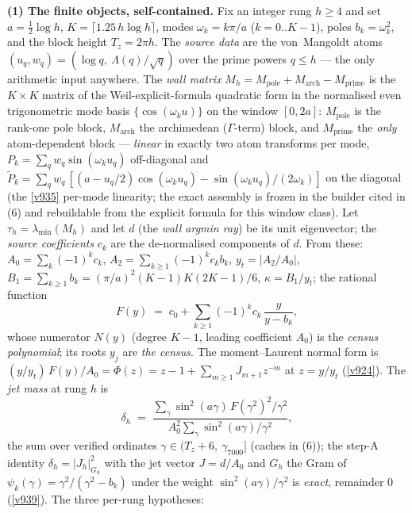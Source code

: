 \par\smallskip\noindent\textbf{(1) The finite objects, self-contained.}  Fix an integer rung
$h \ge 4$ and set $a = \tfrac12\log h$, $K = \lceil 1.25\,h\log h\rceil$, modes
$\omega_k = k\pi/a$ ($k = 0..K{-}1$), poles $b_k = \omega_k^2$, and the block height
$T_z = 2\pi h$.  The \emph{source data} are the von~Mangoldt atoms
$(u_q, w_q) = (\log q,\ \Lambda(q)/\sqrt q)$ over the prime powers $q \le h$ --- the only
arithmetic input anywhere.  The \emph{wall matrix} $M_h = M_{\mathrm{pole}} + M_{\mathrm{arch}}
- M_{\mathrm{prime}}$ is the $K\times K$ matrix of the Weil-explicit-formula quadratic form in
the normalised even trigonometric mode basis $\{\cos(\omega_k u)\}$ on the window $[0, 2a]$:
$M_{\mathrm{pole}}$ is the rank-one pole block, $M_{\mathrm{arch}}$ the archimedean
($\Gamma$-term) block, and $M_{\mathrm{prime}}$ the \emph{only} atom-dependent block ---
\emph{linear} in exactly two atom transforms per mode, $P_k = \sum_q w_q\sin(\omega_k u_q)$
off-diagonal and $\tilde P_k = \sum_q w_q\,[(a - u_q/2)\cos(\omega_k u_q) - \sin(\omega_k u_q)/
(2\omega_k)]$ on the diagonal (the \vref{v935} per-mode linearity; the exact assembly is frozen
in the builder cited in (6) and rebuildable from the explicit formula for this window class).
Let $\tau_h = \lambda_{\min}(M_h)$ and let $d$ (the \emph{wall argmin ray}) be its unit
eigenvector; the \emph{source coefficients} $c_k$ are the de-normalised components of $d$.
From these: $A_0 = \sum_k(-1)^k c_k$, $A_2 = \sum_{k\ge1}(-1)^k c_k b_k$,
$y_t = |A_2/A_0|$, $B_1 = \sum_{k\ge1} b_k = (\pi/a)^2(K{-}1)K(2K{-}1)/6$,
$\kappa = B_1/y_t$; the rational function
\[
  F(y) \;=\; c_0 + \sum_{k\ge1}(-1)^k c_k\,\frac{y}{y - b_k},
\]
whose numerator $N(y)$ (degree $K{-}1$, leading coefficient $A_0$) is the \emph{census
polynomial}; its roots $y_j$ are \emph{the census}.  The moment--Laurent normal form is
$(y/y_t)\,F(y)/A_0 = \Phi(z) = z - 1 + \sum_{m\ge1} J_{m+1} z^{-m}$ at $z = y/y_t$
(\vref{v924}).  The \emph{jet mass} at rung $h$ is
\[
  \delta_h \;=\; \frac{\sum_\gamma \sin^2(a\gamma)\,F(\gamma^2)^2/\gamma^2}
                      {A_0^2 \sum_\gamma \sin^2(a\gamma)/\gamma^2},
\]
the sum over verified ordinates $\gamma \in (T_z + 6,\ \gamma_{7000}]$ (caches in (6)); the
step-A identity $\delta_h = |J_h|^2_{G_h}$ with the jet vector $J = d/A_0$ and $G_h$ the Gram
of $\psi_k(\gamma) = \gamma^2/(\gamma^2 - b_k)$ under the weight $\sin^2(a\gamma)/\gamma^2$ is
\emph{exact}, remainder $0$ (\vref{v939}).  The three per-rung hypotheses:
